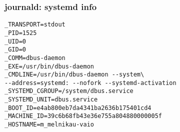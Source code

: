 \documentclass{beamer}
\begin{document}
\begin{frame}[fragile]
    \frametitle{journald: systemd info}
    \begin{block}{}
    \begin{verbatim}
_TRANSPORT=stdout
_PID=1525
_UID=0
_GID=0
_COMM=dbus-daemon
_EXE=/usr/bin/dbus-daemon
_CMDLINE=/usr/bin/dbus-daemon --system\
--address=systemd: --nofork --systemd-activation
_SYSTEMD_CGROUP=/system/dbus.service
_SYSTEMD_UNIT=dbus.service
_BOOT_ID=e4ab800eb7da4341ba2636b175401cd4
_MACHINE_ID=39c6b68fb43e36e755a804880000005f
_HOSTNAME=m_melnikau-vaio
    \end{verbatim}
    \end{block}
\end{frame}
\end{document}
